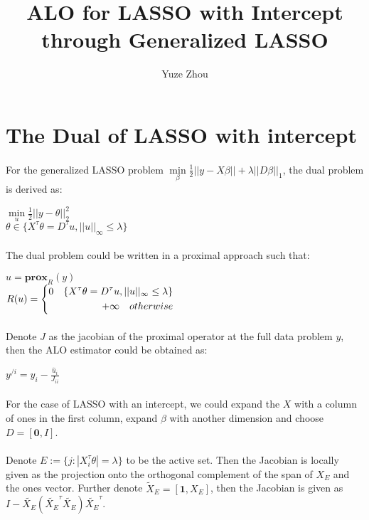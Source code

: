 \documentclass{article}
\title{ALO for LASSO with Intercept through Generalized LASSO}
\author{Yuze Zhou}
\begin{document}
\maketitle
\section{The Dual of LASSO with intercept}
\paragraph{}For the generalized LASSO problem $\min\limits_{\beta}\frac{1}{2}||y-X\beta||+\lambda||D\beta||_{1}$, the dual problem is derived as:
\begin{center}
$\min\limits_{u}\frac{1}{2}||y-\theta||_{2}^{2}$\\
$\theta \in \{X^{\tau}\theta = D^{\tau}u, ||u||_{\infty} \leq \lambda\}$
\end{center}
\paragraph{}The dual problem could be written in a proximal approach such that:
\begin{center}
$\hat{u} = \textbf{prox}_{R}(y)$\\
$R(u) = \left\{
\begin{aligned}
0 \quad \if \theta \in \{X^{\tau}\theta = D^{\tau}u, ||u||_{\infty} \leq \lambda\}\\
+\infty \quad otherwise
\end{aligned}
\right.
$
\end{center}
\paragraph{}Denote $J$ as the jacobian of the proximal operator at the full data problem $y$, then the ALO estimator could be obtained as:
\begin{center}
$y^{/i} = y_{i} - \frac{\hat{u}_{i}}{J_{ii}}$
\end{center}
\paragraph{}For the case of LASSO with an intercept, we could expand the $X$ with a column of ones in the first column, expand $\beta$ with another dimension and choose $D = [\textbf{0}, I ]$.
\paragraph{}Denote $E := \{j: |X_{i}^{\tau}\theta| = \lambda \}$ to be the active set. Then the Jacobian is locally given as the projection onto the orthogonal complement of the span of $X_{E}$ and the ones vector. Further denote $\tilde{X}_{E} = [\textbf{1}, X_{E}]$, then the Jacobian is given as $I - \tilde{X_{E}}(\tilde{X_{E}}^{\tau}\tilde{X_{E}})\tilde{X_{E}}^{\tau}$.
\end{document}
